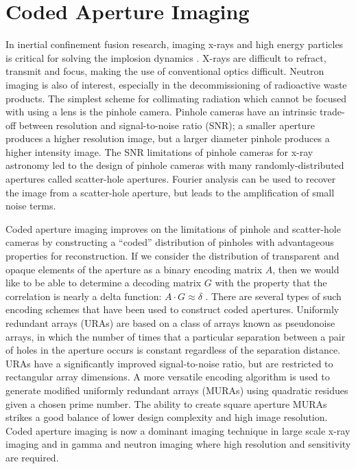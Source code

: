 \documentclass{jpp}
\begin{document}
\section{Coded Aperture Imaging}

In inertial confinement fusion research, imaging x-rays and high energy particles is critical for solving the implosion dynamics \citep{Niki1983}. X-rays are difficult to refract, transmit and focus, making the use of conventional optics difficult. Neutron imaging is also of interest, especially in the decommissioning of radioactive waste products. The simplest scheme for collimating radiation which cannot be focused with using a lens is the pinhole camera. Pinhole cameras have an intrinsic trade-off between resolution and signal-to-noise ratio (SNR); a smaller aperture produces a higher resolution image, but a larger diameter pinhole produces a higher intensity image. The SNR limitations of pinhole cameras for x-ray astronomy led to the design of pinhole cameras with many randomly-distributed apertures called scatter-hole apertures. Fourier analysis can be used to recover the image from a scatter-hole aperture, but leads to the amplification of small noise terms.

Coded aperture imaging improves on the limitations of pinhole and scatter-hole cameras by constructing a ``coded'' distribution of pinholes with advantageous properties for reconstruction. If we consider the distribution of transparent and opaque elements of the aperture as a binary encoding matrix $A$, then we would like to be able to determine a decoding matrix $G$ with the property that the correlation is nearly a delta function: $A \cdot G \approx \delta$ \citep{CIESLAK201659}. There are several types of such encoding schemes that have been used to construct coded apertures. Uniformly redundant arrays (URAs) are based on a class of arrays known as pseudonoise arrays, in which the number of times that a particular separation between a pair of holes in the aperture occurs is constant regardless of the separation distance. URAs have a significantly improved signal-to-noise ratio, but are restricted to rectangular array dimensions. A more versatile encoding algorithm is used to generate modified uniformly redundant arrays (MURAs) using quadratic residues given a chosen prime number. The ability to create square aperture MURAs strikes a good balance of lower design complexity and high image resolution. Coded aperture imaging is now a dominant imaging technique in large scale x-ray imaging and in gamma and neutron imaging where high resolution and sensitivity are required.
\end{document}
